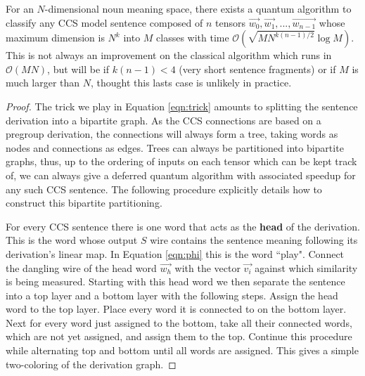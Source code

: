 \begin{theorem}
For an $N$-dimensional noun meaning space, there exists a quantum algorithm to classify any CCS model sentence composed of $n$ tensors $\vec{w_0},\vec{w_1},...,\vec{w_{n-1}}$ whose maximum dimension is $N^k$ into $M$ classes with time $\mathcal{O}(\sqrt{M N^{k(n-1)/2}} \log M)$. This is not always an improvement on the classical algorithm which runs in $\mathcal{O}(MN)$, but will be if $k(n-1) < 4$ (very short sentence fragments) or if $M$ is much larger than $N$, thought this lasts case is unlikely in practice.
\end{theorem}
\begin{proof}
The trick we play in Equation \ref{eqn:trick} amounts to splitting the sentence derivation into a bipartite graph.  As the CCS connections are based on a pregroup derivation, the connections will always form a tree, taking words as nodes and connections as edges. Trees can always be partitioned into bipartite graphs, thus, up to the ordering of inputs on each tensor which can be kept track of, we can always give a deferred quantum algorithm with associated speedup for any such CCS sentence.
 The following procedure explicitly details how to construct this bipartite partitioning.

For every CCS sentence there is one word that acts as the \textbf{head} of the derivation.  This is the word whose output $S$ wire contains the sentence meaning following its derivation's linear map. In Equation \ref{eqn:phi} this is the word ``play". Connect the dangling wire of the head word $\vec{w_h}$ with the vector $\vec{v_i}$ against which similarity is being measured.  Starting with this head word we then separate the sentence into a top layer and a bottom layer with the following steps.  Assign the head word to the top layer. Place every word it is connected to on the bottom layer. Next for every word just assigned to the bottom, take all their connected words, which are not yet assigned, and assign them to the top.  Continue this procedure while alternating top and bottom until all words are assigned. This gives a simple two-coloring of the derivation graph. 
\end{proof}

